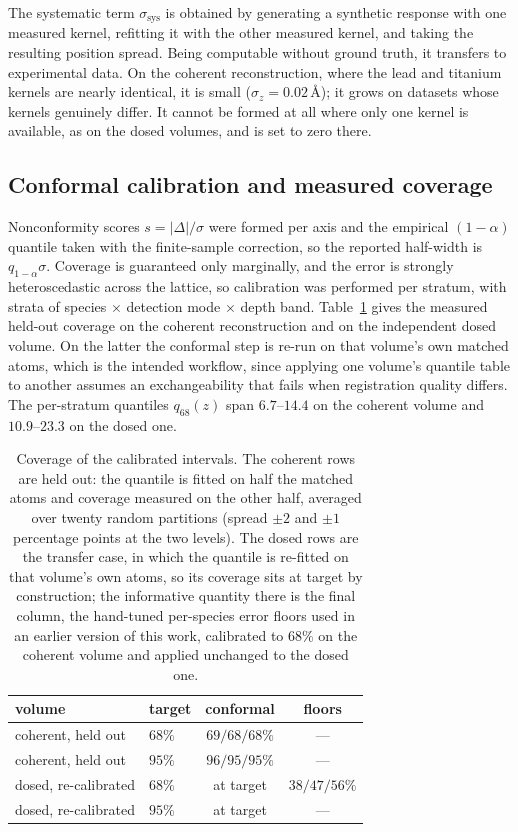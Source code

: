 \documentclass[aps,prb,twocolumn,superscriptaddress,floatfix,nofootinbib]{revtex4-2}
\begin{document}
The systematic term $\sigma_{\mathrm{sys}}$ is obtained by generating a synthetic response with one measured kernel, refitting it with the other measured kernel, and taking the resulting position spread. Being computable without ground truth, it transfers to experimental data. On the coherent reconstruction, where the lead and titanium kernels are nearly identical, it is small ($\sigma_z=0.02$\,\AA); it grows on datasets whose kernels genuinely differ. It cannot be formed at all where only one kernel is available, as on the dosed volumes, and is set to zero there.

\subsection{Conformal calibration and measured coverage}

Nonconformity scores $s=|\Delta|/\sigma$ were formed per axis and the empirical $(1-\alpha)$ quantile taken with the finite-sample correction, so the reported half-width is $q_{1-\alpha}\sigma$. Coverage is guaranteed only marginally, and the error is strongly heteroscedastic across the lattice, so calibration was performed per stratum, with strata of species $\times$ detection mode $\times$ depth band. Table~\ref{tab:cov} gives the measured held-out coverage on the coherent reconstruction and on the independent dosed volume. On the latter the conformal step is re-run on that volume's own matched atoms, which is the intended workflow, since applying one volume's quantile table to another assumes an exchangeability that fails when registration quality differs. The per-stratum quantiles $q_{68}(z)$ span $6.7$--$14.4$ on the coherent volume and $10.9$--$23.3$ on the dosed one.

\begin{table}[t]
  \centering \small
  \begin{tabular}{@{}llcc@{}}
    \toprule
    volume & target & conformal & floors \\
    \midrule
    coherent, held out & $68\%$ & $69/68/68\%$ & --- \\
    coherent, held out & $95\%$ & $96/95/95\%$ & --- \\
    \addlinespace
    dosed, re-calibrated & $68\%$ & at target & $38/47/56\%$ \\
    dosed, re-calibrated & $95\%$ & at target & --- \\
    \bottomrule
  \end{tabular}
  \caption{Coverage of the calibrated intervals. The coherent rows are held out: the quantile is
    fitted on half the matched atoms and coverage measured on the other half, averaged over twenty
    random partitions (spread $\pm2$ and $\pm1$ percentage points at the two levels). The dosed
    rows are the transfer case, in which the quantile is re-fitted on that volume's own atoms, so
    its coverage sits at target by construction; the informative quantity there is the final
    column, the hand-tuned per-species error floors used in an earlier version of this work,
    calibrated to $68\%$ on the coherent volume and applied unchanged to the dosed one.}
  \label{tab:cov}
\end{table}
\end{document}
